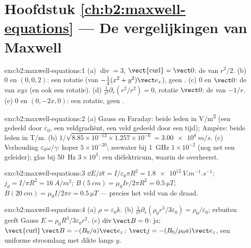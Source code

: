 \section*{Hoofdstuk \ref{ch:b2:maxwell-equations} --- De vergelijkingen van Maxwell}

\begin{solution}{exo:b2:maxwell-equations:1}
(a) $\operatorname{div} = 3$, $\operatorname{\vect{curl}} = \vect 0$: de
 van $r^2/2$. (b) $0$ en $(0, 0, 2)$: een rotatie (van
$-\tfrac12(x^2 + y^2)\vect e_z$), geen . (c) $0$ en $\vect 0$: de
 van $xyz$ (en ook een rotatie). (d)
$\frac1{r^2}\partial_r(r^2/r^2) = 0$, rotatie $\vect 0$: de  van
$-1/r$. (e) $0$ en $(0, -2x, 0)$: een rotatie, geen .
\end{solution}

\begin{solution}{exo:b2:maxwell-equations:2}
(a) Gauss en Faraday: beide leden in \unit{V/m^2} (een 
gedeeld door $\varepsilon_0$, een veldgradiënt, een veld gedeeld door een
tijd); Ampère: beide leden in \unit{T/m}. (b)
$1/\sqrt{8.85 \times 10^{-12} \times 1.257 \times 10^{-6}} = \qty{3.00e8}{m/s}$.
(c) Verhouding $\varepsilon_0\omega/\gamma$: koper $5 \times 10^{-20}$;
zeewater bij \qty{1}{GHz} $1 \times 10^{-2}$ (nog net een geleider); glas
bij \qty{50}{Hz} $3 \times 10^3$: een diëlektricum, waarin de
 overheerst.
\end{solution}

\begin{solution}{exo:b2:maxwell-equations:3}
$\dd E/\dd t = I/\varepsilon_0\pi R^2 = \qty{1.8e12}{V.m^{-1}.s^{-1}}$;
$j_d = I/\pi R^2 =
\qty{16}{A/m^2}$;
$B(\qty{5}{cm}) = \mu_0Ir/2\pi R^2 = \qty{0.5}{\micro T}$;
$B(\qty{20}{cm}) =
\mu_0I/2\pi r = \qty{0.5}{\micro T}$ --- precies het veld
van de draad.
\end{solution}

\begin{solution}{exo:b2:maxwell-equations:4}
(a) $\rho = \varepsilon_0k$. (b)
$\frac1{r^2}\partial_r(\rho_0r^3/3\varepsilon_0) = \rho_0/\varepsilon_0$;
erbuiten geeft Gauss $E = \rho_0R^3/3\varepsilon_0r^2$. (c)
$\operatorname{div}\vect B = 0$: ja;
$\operatorname{\vect{curl}}\vect B = -(B_0/a)\vect e_z$:
$\vect j = -(B_0/\mu_0a)\vect e_z$, een uniforme stroomlaag met dikte langs
$y$.
\end{solution}

